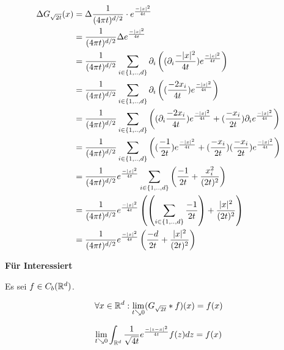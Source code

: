 \documentclass[
 ngerman]{report}
\begin{document}
\begin{minipage}{0.5\linewidth}
  $$ \begin{aligned}
		\Delta G_{\sqrt{2t}} (x) 
		&=\Delta \frac {1} {(4 \pi t)^{d/2}} 
		\cdot e^{ \frac {-|x|^2} {4t}}
		\\
		&= \frac {1} {(4 \pi t)^{d/2}} \Delta  e^{ \frac {-|x|^2} {4t}}
		\\
		&= \frac {1} {(4 \pi t)^{d/2}} \sum_{i\in\left\{1,..,d\right\}} 
		\partial_i\left(
		(\partial_i \frac {-|x|^2} {4t} )e^{ \frac {-|x|^2} {4t}}
		\right)
		\\
		&= \frac {1} {(4 \pi t)^{d/2}} \sum_{i\in\left\{1,..,d\right\}} 
		\partial_i\left(
		(\frac {-2x_i} {4t} )e^{ \frac {-|x|^2} {4t}}
		\right)
		\\
		&= \frac {1} {(4 \pi t)^{d/2}} \sum_{i\in\left\{1,..,d\right\}} 
		\left(
		(\partial_i \frac {-2x_i} {4t} )e^{ \frac {-|x|^2} {4t}}
		+ (\frac {-x_i} {2t} )\partial_ie^{ \frac {-|x|^2} {4t}}
		\right)
		\\
		&= \frac {1} {(4 \pi t)^{d/2}} \sum_{i\in\left\{1,..,d\right\}} 
		\left(
		(\frac {-1} {2t} )e^{ \frac {-|x|^2} {4t}}
		+ (\frac {-x_i} {2t} )
		(\frac {-x_i} {2t} )e^{ \frac {-|x|^2} {4t}}
		\right)
		\\
		&= \frac {1} {(4 \pi t)^{d/2}} e^{ \frac {-|x|^2} {4t}}
		\sum_{i\in\left\{1,..,d\right\}} 
		\left( \frac {-1} {2t} + \frac {x_i^2} {(2t)^2}
		\right) 
		\\
		& = \frac {1} {(4 \pi t)^{d/2}} e^{ \frac {-|x|^2} {4t}}
		\left(\left(\sum_{i\in\left\{1,..,d\right\}} 
		\frac {-1} {2t}\right) + \frac {|x|^2} {(2t)^2}
		\right) 
		\\
		& = \frac {1} {(4 \pi t)^{d/2}} e^{ \frac {-|x|^2} {4t}}
		\left(
		\frac {-d} {2t} + \frac {|x|^2} {(2t)^2}
		\right) 
	\end{aligned}$$
\end{minipage}

\textbf{Für Interessiert}

Es sei $f \in C_b(\mathbb{R}^d)$. 

	$$ \forall x \in \mathbb{R}^d : \lim_{t\searrow 0} (G_{\sqrt{2t}} \ast f)(x) = f(x) $$

$$\lim_{t\searrow 0} \int_{\mathbb{R}^d} \frac {1} {\sqrt{4t}} e^{ \frac {- |z-x|^2} 
	{4t}}f(z) dz = f(x)$$
\end{document}
